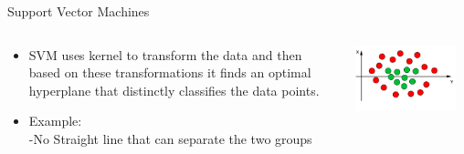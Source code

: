 \documentclass[aspectratio=169, 14pt]{beamer}
\begin{document}
\begin{frame}[t]{Support Vector Machines}
\begin{columns}
	\begin{column}{0.55\textwidth}
        \begin{itemize}
	\item SVM uses kernel to transform the data and then based on these transformations it finds an optimal hyperplane that distinctly classifies the data points.
	\item Example:\\
	  -No Straight line that can separate the two groups
	\end{itemize}
	\end{column}
	\begin{column}{0.45\textwidth}
		\vskip-0.5cm
		\includegraphics[width=0.9\textwidth]{SVM_NonLinear_Images/AIML_SVM_IMG9.png}
        \end{column}
\end{columns}
\end{frame}
\end{document}
